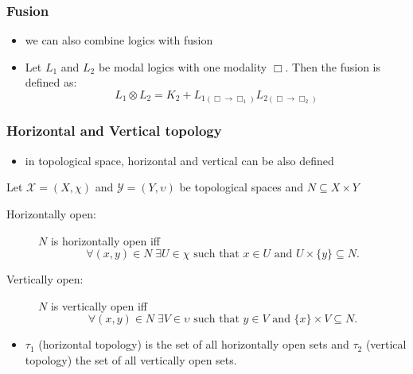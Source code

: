 \documentclass[hyperref={pdfpagelabels=false},t,10pt]{beamer}
\begin{document}
\begin{frame}
  \frametitle{Fusion}
  \begin{itemize}
    \item we can also combine logics with fusion
    \item Let $L_1$ and $L_2$ be modal logics with one modality $\Box$. Then the fusion is defined as:
    $$ L_1 \otimes L_2 = K_2 + L_{1(\Box \rightarrow \Box_1)} L_{2(\Box \rightarrow \Box_2)} $$ 

  \end{itemize}

\end{frame}

\begin{frame}
  \frametitle{Horizontal and Vertical topology}
  \begin{itemize}
    \item in topological space, horizontal and vertical can be also defined \pause
  \end{itemize}
  Let \( \mathcal{X} = (X, \chi) \) and \( \mathcal{Y} = (Y, \upsilon) \) be topological spaces and \( N \subseteq X \times Y \) \newline

\begin{description}
  \item[Horizontally open:] \(N\) is horizontally open iff 
  \[
    \forall (x, y) \in N\; \exists U \in \chi \text{ such that } x \in U \text{ and } U \times \{y\} \subseteq N.
  \]

  \item[Vertically open:] \(N\) is vertically open iff 
  \[
    \forall (x, y) \in N\; \exists V \in \upsilon \text{ such that } y \in V \text{ and } \{x\} \times V \subseteq N.
  \]

\end{description}
\begin{itemize}
  \item $\tau_1$ (horizontal topology) is the set of all horizontally open sets and $\tau_2$ (vertical topology) the set of all vertically open sets.
\end{itemize}



\end{frame}
\end{document}
